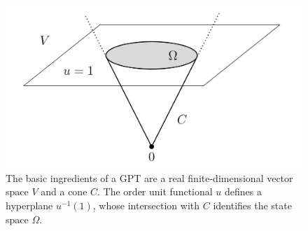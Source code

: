 \documentclass{article}
\theoremstyle{definition}
\theoremstyle{remark}
\begin{document}
\begin{figure}[!h]
  \begin{center}
    \includegraphics[scale=0.25]{GPT.png}
    \caption{The basic ingredients of a GPT are a real finite-dimensional vector space $V$ and a cone $C$. The order unit functional $u$ defines a hyperplane $u^{-1}(1)$, whose intersection with $C$ identifies the state space $\Omega$.}
    \label{GPT}
  \end{center}
\end{figure}
\end{document}
